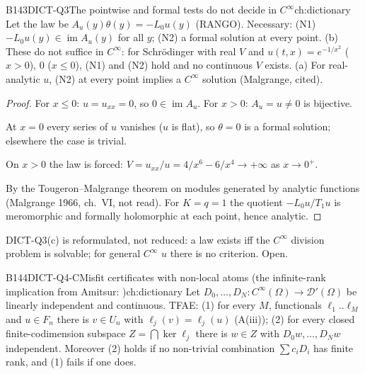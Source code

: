 \begin{dimcard}{B143}{DICT-Q3}{The pointwise and formal tests do not decide in $C^\infty$}{\pw}{ch:dictionary}
Let the law be $A_u(y)\theta(y)=-L_0u(y)$ (RANGO). Necessary: (N1) $-L_0u(y)\in\operatorname{im}A_u(y)$ for all $y$; (N2) a formal solution at every point. (b) These do not suffice in $C^\infty$: for Schr\"odinger with real $V$ and $u(t,x)=e^{-1/x^2}$ ($x>0$), $0$ ($x\le0$), (N1) and (N2) hold and no continuous $V$ exists. (a) For real-analytic $u$, (N2) at every point implies a $C^\infty$ solution (Malgrange, cited).
\end{dimcard}

\begin{proof}
For $x\le0$: $u=u_{xx}=0$, so $0\in\operatorname{im}A_u$. For $x>0$: $A_u=u\ne0$ is bijective.

At $x=0$ every series of $u$ vanishes ($u$ is flat), so $\theta=0$ is a formal solution; elsewhere the case is trivial.

On $x>0$ the law is forced: $V=u_{xx}/u=4/x^6-6/x^4\to+\infty$ as $x\to0^+$.

By the Tougeron--Malgrange theorem on modules generated by analytic functions (Malgrange 1966, ch.~VI, not read). For $K=q=1$ the quotient $-L_0u/T_1u$ is meromorphic and formally holomorphic at each point, hence analytic.

\end{proof}

\begin{caution}[title=Status]
DICT-Q3(c) is reformulated, not reduced: a law exists iff the $C^\infty$ division problem is solvable; for general $C^\infty$ $u$ there is no criterion. Open.
\end{caution}

\begin{dimcard}{B144}{DICT-Q4-C}{Misfit certificates with non-local atoms}{\pw{} (the infinite-rank implication from Amitsur: \cf)}{ch:dictionary}
Let $D_0,\dots,D_N:C^\infty(\Omega)\to\mathcal D'(\Omega)$ be linearly independent and continuous. TFAE: (1) for every $M$, functionals $\ell_1..\ell_M$ and $u\in F_n$ there is $v\in U_n$ with $\ell_j(v)=\ell_j(u)$ (A(iii)); (2) for every closed finite-codimension subspace $Z=\bigcap\ker\ell_j$ there is $w\in Z$ with $D_0w,\dots,D_Nw$ independent. Moreover (2) holds if no non-trivial combination $\sum c_iD_i$ has finite rank, and (1) fails if one does.
\end{dimcard}


